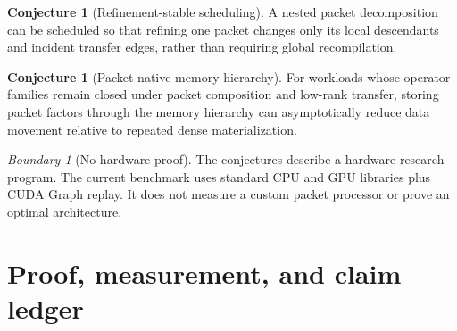 \documentclass[11pt]{article}
\theoremstyle{definition}
\newtheorem{conjecture}[theorem]{Conjecture}
\theoremstyle{remark}
\newtheorem{boundary}[theorem]{Boundary}
\begin{document}
\begin{conjecture}[Refinement-stable scheduling]
A nested packet decomposition can be scheduled so that refining one packet changes only its local descendants and incident transfer edges, rather than requiring global recompilation.
\end{conjecture}

\begin{conjecture}[Packet-native memory hierarchy]
For workloads whose operator families remain closed under packet composition and low-rank transfer, storing packet factors through the memory hierarchy can asymptotically reduce data movement relative to repeated dense materialization.
\end{conjecture}

\begin{boundary}[No hardware proof]
The conjectures describe a hardware research program. The current benchmark uses standard CPU and GPU libraries plus CUDA Graph replay. It does not measure a custom packet processor or prove an optimal architecture.
\end{boundary}

\section{Proof, measurement, and claim ledger}
\end{document}
